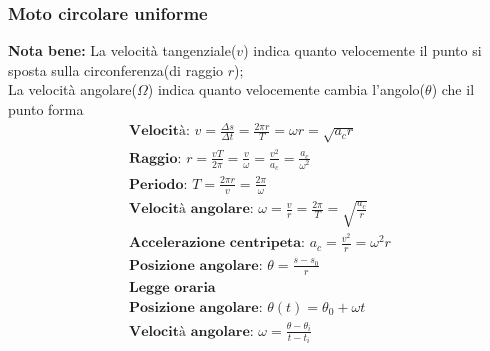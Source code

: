 \subsubsection{Moto circolare uniforme}
\textbf{Nota bene: } La velocità tangenziale($v$) indica quanto velocemente il punto si sposta sulla circonferenza(di raggio $r$); \\
La velocità angolare($\Omega$) indica quanto velocemente cambia l'angolo($\theta$) che il punto forma
\begin{gather*}
    \textbf{Velocità: } v = \frac{\Delta s}{\Delta t} = \frac{2 \pi r}{T} = \omega r = \sqrt{a_c r} \\
    \textbf{Raggio: } r = \frac{v T}{2 \pi} = \frac{v}{\omega} = \frac{v^2}{a_c} = \frac{a_c}{\omega^2} \\
    \textbf{Periodo: } T = \frac{2 \pi r}{v} = \frac{2 \pi}{\omega} \\
    \textbf{Velocità angolare: } \omega = \frac{v}{r} = \frac{2 \pi}{T} = \sqrt{\frac{a_c}{r}} \\
    \textbf{Accelerazione centripeta: } a_c = \frac{v^2}{r} = \omega^2 r \\
    \textbf{Posizione angolare: } \theta = \frac{s - s_0}{r} \\
    \textbf{Legge oraria} \\
    \textbf{Posizione angolare: } \theta(t) = \theta_0 + \omega t \\
    \textbf{Velocità angolare: } \omega = \frac{\theta - \theta_i}{t - t_i}
\end{gather*}
